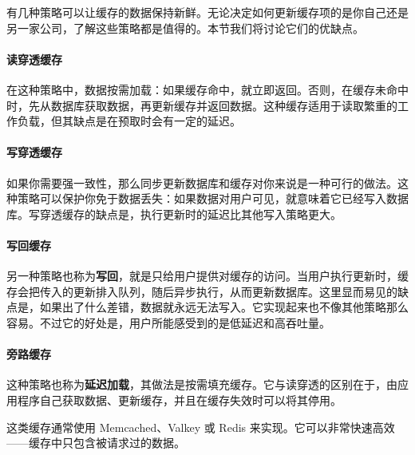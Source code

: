 \label{idx:387}
有几种策略可以让缓存的数据保持新鲜。无论决定如何更新缓存项的是你自己还是另一家公司，了解这些策略都是值得的。本节我们将讨论它们的优缺点。

\paragraph{读穿透缓存}

\label{idx:388}
在这种策略中，数据按需加载：如果缓存命中，就立即返回。否则，在缓存未命中时，先从数据库获取数据，再更新缓存并返回数据。这种缓存适用于读取繁重的工作负载，但其缺点是在预取时会有一定的延迟。


\paragraph{写穿透缓存}

\label{idx:389}
如果你需要强一致性，那么同步更新数据库和缓存对你来说是一种可行的做法。这种策略可以保护你免于数据丢失：如果数据对用户可见，就意味着它已经写入数据库。写穿透缓存的缺点是，执行更新时的延迟比其他写入策略更大。


\paragraph{写回缓存}

\label{idx:390}
\label{idx:391}
另一种策略也称为\textbf{写回}，就是只给用户提供对缓存的访问。当用户执行更新时，缓存会把传入的更新排入队列，随后异步执行，从而更新数据库。这里显而易见的缺点是，如果出了什么差错，数据就永远无法写入。它实现起来也不像其他策略那么容易。不过它的好处是，用户所能感受到的是低延迟和高吞吐量。


\paragraph{旁路缓存}

\label{idx:392}
这种策略也称为\textbf{延迟加载}，其做法是按需填充缓存。它与读穿透的区别在于，由应用程序自己获取数据、更新缓存，并且在缓存失效时可以将其停用。


这类缓存通常使用 Memcached、Valkey 或 Redis 来实现。它可以非常快速高效——缓存中只包含被请求过的数据。

